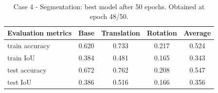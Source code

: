 \begin{table}[ht]
    \begin{center}
        \begin{tabular}{|l||c|c|c|c|}
            \hline
            Evaluation metrics & Base & Translation & Rotation & Average \\
            \hline \hline
            train accuracy & 0.620 & 0.733 & 0.217 & 0.524 \\
            \hline
            train IoU & 0.384 & 0.481 & 0.165 & 0.343 \\
            \hline
            test accuracy & 0.672 & 0.762 & 0.208 & 0.547 \\
            \hline
            test IoU & 0.386 & 0.516 & 0.166 & 0.356 \\
            \hline
        \end{tabular}
    \end{center}
    \caption{Case 4 - Segmentation: best model after 50 epochs. Obtained at epoch 48/50.}
    \label{tab:seg_flow_noise}
\end{table}
